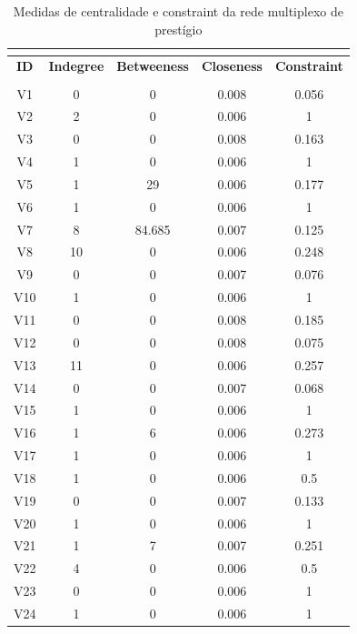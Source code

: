 \documentclass[a4paper, 12pt, openright, oneside, german, french, english, brazil]{abntex2}
\begin{document}
	\begin{SingleSpace}
		\begin{footnotesize}
			\begin{center}
				\begin{longtable}{c c c c c}
					\caption{Medidas de centralidade e constraint da rede multiplexo de prestígio}\\
					\label{centralidades:multiplexo}\\
					\hline
					\textbf{ID}  & \textbf{Indegree} & \textbf{Betweeness} & \textbf{Closeness} & \textbf{Constraint} \\
					\hline
					\endfirsthead
					\hline
					\endhead
					\hline
					\endfoot
					\hline
					\multicolumn{5}{l}{Fonte: Elaboração do autor}\\
					\endlastfoot
					V1 & 0 & 0 & 0.008 & 0.056 \\ 
					V2 & 2 & 0 & 0.006 & 1 \\ 
					V3 & 0 & 0 & 0.008 & 0.163 \\ 
					V4 & 1 & 0 & 0.006 & 1 \\ 
					V5 & 1 & 29 & 0.006 & 0.177 \\ 
					V6 & 1 & 0 & 0.006 & 1 \\ 
					V7 & 8 & 84.685 & 0.007 & 0.125 \\ 
					V8 & 10 & 0 & 0.006 & 0.248 \\ 
					V9 & 0 & 0 & 0.007 & 0.076 \\ 
					V10 & 1 & 0 & 0.006 & 1 \\ 
					V11 & 0 & 0 & 0.008 & 0.185 \\ 
					V12 & 0 & 0 & 0.008 & 0.075 \\ 
					V13 & 11 & 0 & 0.006 & 0.257 \\ 
					V14 & 0 & 0 & 0.007 & 0.068 \\ 
					V15 & 1 & 0 & 0.006 & 1 \\ 
					V16 & 1 & 6 & 0.006 & 0.273 \\ 
					V17 & 1 & 0 & 0.006 & 1 \\ 
					V18 & 1 & 0 & 0.006 & 0.5 \\ 
					V19 & 0 & 0 & 0.007 & 0.133 \\ 
					V20 & 1 & 0 & 0.006 & 1 \\ 
					V21 & 1 & 7 & 0.007 & 0.251 \\ 
					V22 & 4 & 0 & 0.006 & 0.5 \\ 
					V23 & 0 & 0 & 0.006 & 1 \\ 
					V24 & 1 & 0 & 0.006 & 1 \\ 

\end{longtable}
\end{center}
\end{footnotesize}
\end{SingleSpace}
\end{document}
